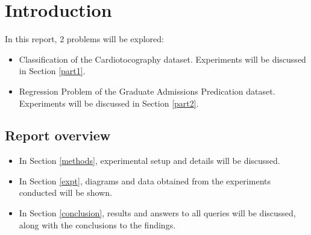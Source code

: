 \chapter{Introduction}
In this report, 2 problems will be explored:
\begin{itemize}
    \item Classification of the Cardiotocography dataset. Experiments will be discussed in Section \ref{part1}.
    \item Regression Problem of the Graduate Admissions Predication dataset. Experiments will be discussed in Section \ref{part2}.
\end{itemize}

\section{Report overview}
\begin{itemize}
    \item In Section \ref{methods}, experimental setup and details will be discussed.
    \item In Section \ref{expt}, diagrams and data obtained from the experiments conducted will be shown.
    \item In Section \ref{conclusion}, results and answers to all queries will be discussed, along with the conclusions to the findings.
\end{itemize}
